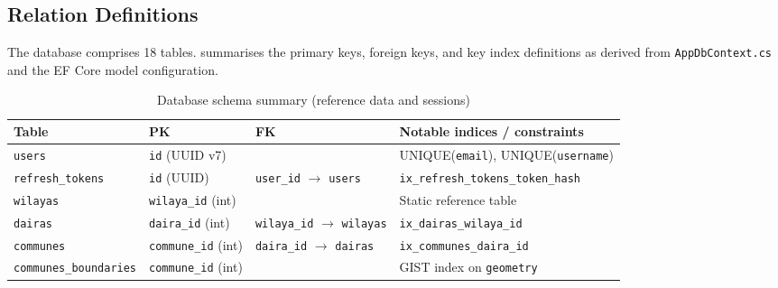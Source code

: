 \documentclass[12pt,a4paper]{article}
\theoremstyle{definition}
\theoremstyle{plain}
\theoremstyle{remark}
\begin{document}
\subsection{Relation Definitions}

The database comprises 18 tables.  summarises the
primary keys, foreign keys, and key index definitions as derived from
\texttt{AppDbContext.cs} and the EF Core model configuration.

\begin{table}[H]
\centering
\caption{Database schema summary (reference data and sessions)}
\label{tab:schema}
\begin{tabularx}{\textwidth}{ll>{\raggedright\arraybackslash}X>{\raggedright\arraybackslash}X}
\toprule
\textbf{Table} & \textbf{PK} & \textbf{FK} & \textbf{Notable indices / constraints} \\
\midrule
\texttt{users}
  & \texttt{id} (UUID v7)
  &
  & UNIQUE(\texttt{email}), UNIQUE(\texttt{username}) \\
\texttt{refresh\_\allowbreak{}tokens}
  & \texttt{id} (UUID)
  & \texttt{user\_\allowbreak{}id} $\to$ \texttt{users}
  & \texttt{ix\_\allowbreak{}refresh\_\allowbreak{}tokens\_\allowbreak{}token\_\allowbreak{}hash} \\
\texttt{wilayas}
  & \texttt{wilaya\_\allowbreak{}id} (int)
  &
  & Static reference table \\
\texttt{dairas}
  & \texttt{daira\_\allowbreak{}id} (int)
  & \texttt{wilaya\_\allowbreak{}id} $\to$ \texttt{wilayas}
  & \texttt{ix\_\allowbreak{}dairas\_\allowbreak{}wilaya\_\allowbreak{}id} \\
\texttt{communes}
  & \texttt{commune\_\allowbreak{}id} (int)
  & \texttt{daira\_\allowbreak{}id} $\to$ \texttt{dairas}
  & \texttt{ix\_\allowbreak{}communes\_\allowbreak{}daira\_\allowbreak{}id} \\
\texttt{communes\_\allowbreak{}boundaries}
  & \texttt{commune\_\allowbreak{}id} (int)
  &
  & GIST index on \texttt{geometry} \\
\bottomrule
\end{tabularx}
\end{table}
\end{document}
